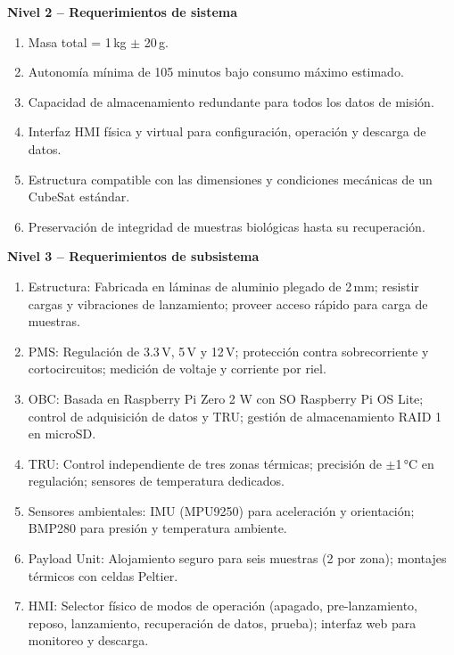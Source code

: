     \textbf{Nivel 2 – Requerimientos de sistema}
    \begin{enumerate}
        \item Masa total = 1\,kg $\pm$ 20\,g.
        \item Autonomía mínima de 105 minutos bajo consumo máximo estimado.
        \item Capacidad de almacenamiento redundante para todos los datos de misión.
        \item Interfaz HMI física y virtual para configuración, operación y descarga de datos.
        \item Estructura compatible con las dimensiones y condiciones mecánicas de un CubeSat estándar.
        \item Preservación de integridad de muestras biológicas hasta su recuperación.
    \end{enumerate}
    
    \textbf{Nivel 3 – Requerimientos de subsistema}
    \begin{enumerate}
        \item Estructura: Fabricada en láminas de aluminio plegado de 2\,mm; resistir cargas y vibraciones de
          lanzamiento; proveer acceso rápido para carga de muestras.
        \item PMS: Regulación de 3.3\,V, 5\,V y 12\,V; protección contra sobrecorriente y cortocircuitos; medición de
          voltaje y corriente por riel.
        \item OBC: Basada en Raspberry Pi Zero 2 W con SO Raspberry Pi OS Lite; control de adquisición de datos y TRU;
          gestión de almacenamiento RAID 1 en microSD.
        \item TRU: Control independiente de tres zonas térmicas; precisión de $\pm$1\,°C en regulación; sensores de
          temperatura dedicados.
        \item Sensores ambientales: IMU (MPU9250) para aceleración y orientación; BMP280 para presión y temperatura
          ambiente.
        \item Payload Unit: Alojamiento seguro para seis muestras (2 por zona); montajes térmicos con celdas Peltier.
        \item HMI: Selector físico de modos de operación (apagado, pre-lanzamiento, reposo, lanzamiento, recuperación de
          datos, prueba); interfaz web para monitoreo y descarga.
    \end{enumerate}
    
